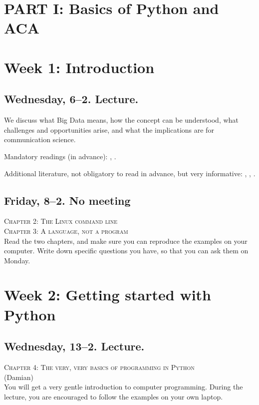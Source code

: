 \documentclass[a4paper,10pt]{report}
\begin{document}
\section*{PART I: Basics of Python and ACA}

\section*{Week 1: Introduction}
\subsection*{Wednesday, 6--2. Lecture.}
We discuss what Big Data means, how the concept can be understood, what challenges and opportunities arise, and what the implications are for communication science. 

Mandatory readings (in advance): \citealp{boyd2012}, \citealp{Kitchin2014}. 

Additional literature, not obligatory to read in advance, but very informative: \citealp{Mahrt2013}, \citealp{Vis2013}, \citealp{Trilling2017a}.



\subsection*{Friday, 8--2. No meeting}
\textsc{ Chapter 2: The Linux command line}\\
\textsc{ Chapter 3: A language, not a program}\\

Read the two chapters, and make sure you can reproduce the examples on your computer. Write down specific questions you have, so that you can ask them on Monday.




\section*{Week 2: Getting started with Python}

\subsection*{Wednesday, 13--2. Lecture.}
\textsc{ Chapter 4: The very, very basics of programming in Python}\\
{\footnotesize{(Damian)}\\}
You will get a very gentle introduction to computer programming. During the lecture, you are encouraged to follow the examples on your own laptop.
\end{document}

